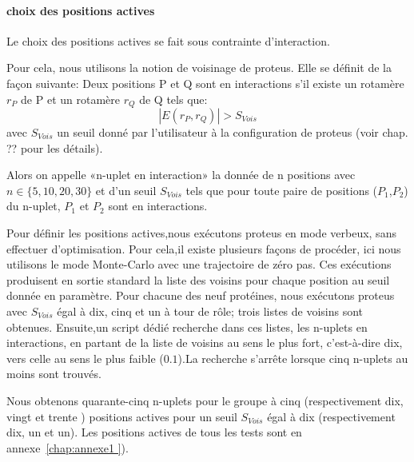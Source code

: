 \paragraph{choix des  positions actives}

Le choix des positions actives se fait sous contrainte d'interaction.

Pour cela, nous utilisons la notion de voisinage de proteus. Elle se définit de la façon suivante:  
Deux positions P et Q sont en interactions s'il existe un rotamère $r_P$ de P et un rotamère $r_Q$ de Q tels que:
\begin{displaymath}
 | E(r_P,r_Q) | > S_{Vois}
\end{displaymath} 
avec $S_{Vois}$ un seuil donné par l'utilisateur à la configuration de proteus (voir chap. ?? pour les détails).

Alors on appelle «n-uplet en interaction» la donnée de n positions avec $n \in \{5,10,20,30\}$ et d'un seuil  $S_{Vois}$  tels que pour toute paire de positions ($P_1$,$P_2$) du n-uplet, $P_1$ et $P_2$ sont en interactions.

Pour définir les positions actives,nous exécutons proteus en mode verbeux, sans effectuer d'optimisation. Pour cela,il existe plusieurs façons de procéder, ici nous utilisons le mode Monte-Carlo avec une trajectoire de zéro pas. Ces exécutions produisent en sortie standard la liste des voisins pour chaque position au seuil donnée en paramètre.
Pour chacune des neuf protéines, nous exécutons proteus avec $S_{Vois}$ égal à dix, cinq et un à tour de rôle; trois listes de voisins sont obtenues. 
Ensuite,un script dédié recherche dans ces listes, les n-uplets en interactions, en partant de la liste de voisins au sens le plus fort, c'est-à-dire dix, vers celle  au sens le plus faible ($0.1$).La recherche s'arrête lorsque cinq n-uplets au moins sont trouvés.

Nous obtenons quarante-cinq n-uplets pour le groupe à cinq (respectivement dix, vingt et trente ) positions actives pour un seuil $S_{Vois}$ égal à dix (respectivement dix, un et un). Les positions actives de tous les tests sont en annexe~\ref{chap:annexe1 }). 



